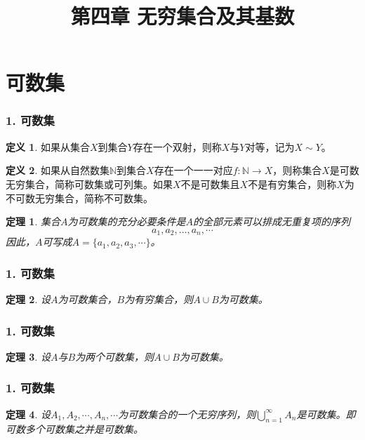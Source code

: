 \documentclass{beamer}
\begin{document}
\begin{CJK*}{UTF8}{gbsn}

\newtheorem{Thm}{定理}[section]
\newtheorem{Cor}{推论}[section]
\newtheorem{Ax}{公理}[section]
\theoremstyle{definition}
\newtheorem{Def}{定义}[section]
\theoremstyle{example}
\newtheorem*{Ex}{例：}
\date{}
\author{}

\title{第四章 无穷集合及其基数}
\begin{frame}
  \titlepage
\end{frame}  
\section{可数集}
\begin{frame}
  \frametitle{1. 可数集}
  \begin{Def}
    如果从集合$X$到集合$Y$存在一个双射，则称$X$与$Y$\alert{对等}，记为$X \sim Y$。
  \end{Def}\pause
  \begin{Def}
    如果从自然数集$\mathbb{N}$到集合$X$存在一个一一对应$f:\mathbb{N}\to X$，则称集合$X$是可数无穷集合，简称\alert{可数集}或\alert{可列集}。如果$X$不是可数集且$X$不是有穷集合，则称$X$为不可数无穷集合，简称\alert{不可数集}。
  \end{Def}\pause
  \begin{Thm}
    集合$A$为可数集的充分必要条件是$A$的全部元素可以排成无重复项的序列
    \[a_1, a_2, \ldots, a_n, \cdots\]
    因此，$A$可写成$A = \{a_1, a_2, a_3, \cdots\}$。
  \end{Thm}
\end{frame}

\begin{frame}
  \frametitle{1. 可数集}
  \begin{Thm}
   设$A$为可数集合，$B$为有穷集合，则$A\cup B$为可数集。
  \end{Thm}
\end{frame}

\begin{frame}
  \frametitle{1. 可数集}
  \begin{Thm}
    设$A$与$B$为两个可数集，则$A\cup B$为可数集。
  \end{Thm}
\end{frame}

\begin{frame}
  \frametitle{1. 可数集}
  \begin{Thm}
    设$A_1, A_2, \cdots, A_n, \cdots$为可数集合的一个无穷序列，则$\bigcup_{n=1}^{\infty}A_n$是可数集。即可数多个可数集之并是可数集。
  \end{Thm}
\end{frame}


\end{CJK*}
\end{document}
